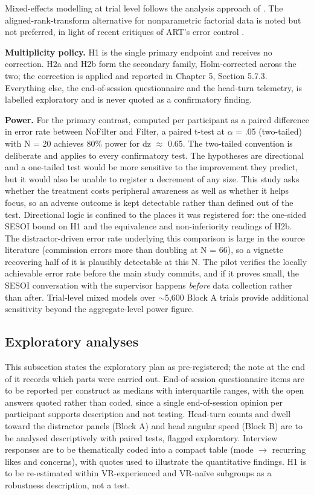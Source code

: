 Mixed-effects modelling at trial level follows the analysis approach of \citet{mclaughlin2025}. The
aligned-rank-transform alternative for nonparametric factorial data \citep{wobbrock2011} is noted
but not preferred, in light of recent critiques of ART's error control \citep{tsandilas2024}.

\textbf{Multiplicity policy.} H1 is the single primary endpoint and receives no correction. H2a and H2b
form the secondary family, Holm-corrected across the two; the correction is applied and reported in
Chapter 5, Section 5.7.3. Everything else, the end-of-session
questionnaire and the head-turn telemetry, is labelled exploratory and is never quoted as a
confirmatory finding.

\textbf{Power.} For the primary contrast, computed per participant as a paired difference in error rate
between NoFilter and Filter, a paired t-test at $\alpha$ = .05 (two-tailed) with N = 20 achieves 80\%
power for dz $\approx$ 0.65. The two-tailed convention is deliberate and applies to every confirmatory
test. The hypotheses are directional and a one-tailed test would be more sensitive to the improvement
they predict, but it would also be unable to register a decrement of any size. This study asks whether
the treatment costs peripheral awareness as well as whether it helps focus, so an adverse outcome is
kept detectable rather than defined out of the test. Directional logic is confined to the places it was
registered for: the one-sided SESOI bound on H1 and the equivalence and non-inferiority readings of H2b. The distractor-driven error rate underlying this comparison is large in the
source literature (commission errors more than doubling at N = 66), so a vignette recovering half of
it is plausibly detectable at this N. The pilot verifies the locally achievable error rate before the
main study commits, and if it proves small, the SESOI conversation with the supervisor happens
\textit{before} data collection rather than after. Trial-level mixed models over $\sim$5,600 Block A
trials provide additional sensitivity beyond the aggregate-level power figure.

\subsection{Exploratory analyses}

This subsection states the exploratory plan as pre-registered; the note at the end of it records
which parts were carried out.
End-of-session questionnaire items are to be reported per construct as
medians with interquartile ranges, with the open answers quoted rather than coded, since a
single end-of-session opinion per participant supports description and not testing. Head-turn counts and dwell toward the distractor panels (Block A) and head angular
speed (Block B) are to be analysed descriptively with paired tests, flagged exploratory. Interview responses
are to be thematically coded into a compact table (mode $\rightarrow$ recurring likes and concerns), with quotes
used to illustrate the quantitative findings. H1 is to be re-estimated within VR-experienced and VR-naïve
subgroups as a robustness description, not a test.

